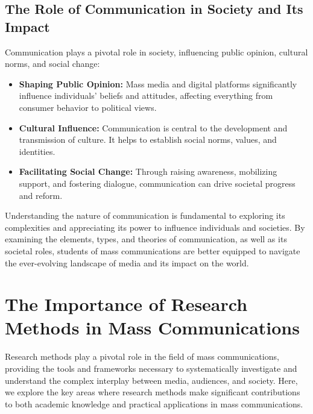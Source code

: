 \documentclass[
]{book}
\providecommand{\tightlist}{%
  \setlength{\itemsep}{0pt}\setlength{\parskip}{0pt}}
\begin{document}
\hypertarget{the-role-of-communication-in-society-and-its-impact}{%
\subsection*{The Role of Communication in Society and Its Impact}\label{the-role-of-communication-in-society-and-its-impact}}

Communication plays a pivotal role in society, influencing public opinion, cultural norms, and social change:

\begin{itemize}
\tightlist
\item
  \textbf{Shaping Public Opinion:} Mass media and digital platforms significantly influence individuals' beliefs and attitudes, affecting everything from consumer behavior to political views.
\item
  \textbf{Cultural Influence:} Communication is central to the development and transmission of culture. It helps to establish social norms, values, and identities.
\item
  \textbf{Facilitating Social Change:} Through raising awareness, mobilizing support, and fostering dialogue, communication can drive societal progress and reform.
\end{itemize}

Understanding the nature of communication is fundamental to exploring its complexities and appreciating its power to influence individuals and societies. By examining the elements, types, and theories of communication, as well as its societal roles, students of mass communications are better equipped to navigate the ever-evolving landscape of media and its impact on the world.

\hypertarget{the-importance-of-research-methods-in-mass-communications}{%
\section{The Importance of Research Methods in Mass Communications}\label{the-importance-of-research-methods-in-mass-communications}}

Research methods play a pivotal role in the field of mass communications, providing the tools and frameworks necessary to systematically investigate and understand the complex interplay between media, audiences, and society. Here, we explore the key areas where research methods make significant contributions to both academic knowledge and practical applications in mass communications.
\end{document}
